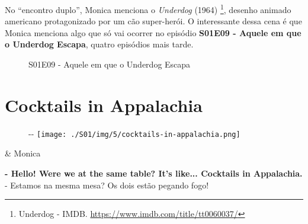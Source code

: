 No ``encontro duplo'', Monica menciona o \emph{Underdog} (1964)
\footnote{\sloppy Underdog - IMDB. \url{https://www.imdb.com/title/tt0060037/}},
desenho animado americano protagonizado por um cão super-herói. O
interessante dessa cena é que Monica menciona algo que só vai ocorrer no
episódio
\textbf{\textcolor{primarycolor}{S01E09 - Aquele em que o Underdog Escapa}},
quatro episódios mais tarde.

\begin{figure}
  \centering
    \caption{S01E09 - Aquele em que o Underdog Escapa\label{fig:s01-e09-aquele-em-que-o-underdog-escapa}}
\end{figure}

\hypertarget{cocktails-in-appalachia}{%
\section{Cocktails in Appalachia}\label{cocktails-in-appalachia}}

\begin{figure}[!ht]
  \begin{adjustwidth}{-\oddsidemargin-1in}{-\rightmargin}
    \centering
    \texttt{[image: ./S01/img/5/cocktails-in-appalachia.png]}
  \end{adjustwidth}
\end{figure}

\begin{tcolorbox}[enhanced,center upper,
    drop fuzzy shadow southeast, boxrule=0.3pt,
    lower separated=false, breakable,
    colframe=black!30!dialogoBorder,colback=white]
\begin{minipage}[c]{0.16\linewidth}
   & \centering \scriptsize{Monica}
\end{minipage}
\hfill
\begin{minipage}[c]{0.8\linewidth}
  \textbf{- Hello! Were we at the same table? It's like... Cocktails in Appalachia.}\\
  - Estamos na mesma mesa? Os dois estão pegando fogo!
\end{minipage}
\end{tcolorbox}

